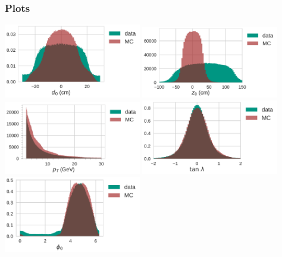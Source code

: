 \documentclass[18pt]{beamer}
\begin{document}
\begin{frame}[allowframebreaks]
  \frametitle{Plots}
  \includegraphics[width=0.45\textwidth]{figures/gcr_august_2017_d0_distribution.pdf}
  \includegraphics[width=0.45\textwidth]{figures/gcr_august_2017_z0_distribution.pdf}\\
    \includegraphics[width=0.45\textwidth]{figures/gcr_august_2017_pt_distribution.pdf}
    \includegraphics[width=0.45\textwidth]{figures/gcr_august_2017_tan_lambda_distribution.pdf}
    \includegraphics[width=0.45\textwidth]{figures/gcr_august_2017_phi0_distribution.pdf}\\
\end{frame}
\end{document}
